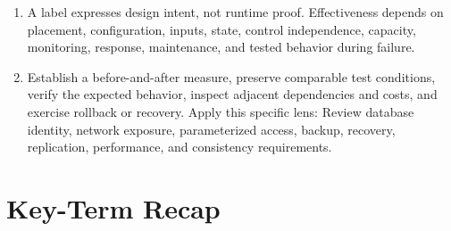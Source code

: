 \documentclass[11pt]{article}
\begin{document}
\begin{enumerate}
\item A label expresses design intent, not runtime proof. Effectiveness depends on placement, configuration, inputs, state, control independence, capacity, monitoring, response, maintenance, and tested behavior during failure.
\item Establish a before-and-after measure, preserve comparable test conditions, verify the expected behavior, inspect adjacent dependencies and costs, and exercise rollback or recovery. Apply this specific lens: Review database identity, network exposure, parameterized access, backup, recovery, replication, performance, and consistency requirements.
\end{enumerate}
\section{Key-Term Recap}
\end{document}

